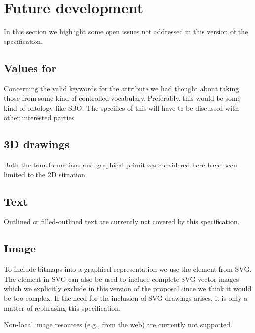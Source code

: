 
\section{Future development}
\label{future}

In this section we highlight some open issues not addressed in this version
of the \Render specification.


\subsection{Values for }


Concerning the valid 
keywords for the  attribute we had thought about taking those 
from some kind of controlled vocabulary. Preferably, this would be some kind of 
ontology like SBO. The specifics of this will have to be discussed with other 
interested parties

\subsection{3D drawings}
Both the transformations and graphical primitives considered here have been limited to the 2D situation. 

\subsection{Text}
Outlined or filled-outlined text are currently not covered by this specification.

\subsection{Image}
To include bitmaps into a graphical representation we use the \Image element 
from SVG. The \Image element in SVG can also be used to include complete SVG 
vector images which we explicitly exclude in this version of the proposal 
since we think it would be too complex. If the need for the inclusion of SVG 
drawings arises, it is only a matter of rephrasing this specification.

Non-local image resources (e.g., from the web) are currently not supported.
